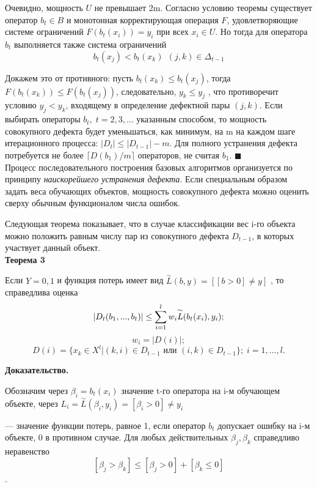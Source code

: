Очевидно, мощность $U$ не превышает 2m. Согласно условию теоремы существует оператор $b_t \in B$ и монотонная корректирующая операция $F$, удовлетворяющие системе
ограничений $F(b_t(x_i)) = y_i$ при всех $x_i \in U$. Но тогда для оператора $b_t$ выполняется
также система ограничений
\[ b_t(x_j) < b_t(x_k) \; \, (j, k) \in \Delta_{t-1}\]


Докажем это от противного: пусть $b_t(x_k) \leq b_t(x_j )$, тогда $F(b_t(x_k)) \leq F(b_t(x_j ))$, следовательно, $y_k \leq y_j$
, что противоречит условию $y_j < y_k$, входящему в определение
дефектной пары $(j, k)$.
Если выбирать операторы $b_t , \; t = 2, 3, . . .$ указанным способом, то мощность
совокупного дефекта будет уменьшаться, как минимум, на m на каждом шаге итерационного процесса: $\vert D_t \vert \leq \vert D_{t-1}\vert -m$. Для полного устранения дефекта потребуется не более $\lceil D(b_1)/m\rceil$
операторов, не считая $b_1$. $\blacksquare$
\\

Процесс последовательного построения базовых алгоритмов организуется
по принципу \textit{наискорейшего устранения дефекта}.
Если специальным образом задать веса
обучающих объектов, мощность совокупного дефекта можно оценить сверху
обычным функционалом числа ошибок.

Следующая теорема показывает, что в случае классификации вес i-го объекта
можно положить равным числу пар из совокупного дефекта $D_{t-1}$, в которых участвует данный объект.\\

\textbf{Теорема 3}

Если $Y = {0, 1}$ и функция потерь имеет вид $\overset{\sim}{L}(b, y) =[[b > 0]\neq y]$ , то справедлива оценка \[\vert D_t(b_1, . . . , b_t)\vert \leq \operatornamewithlimits{\sum}^l_{i=1} w_i \overset{\sim}{L} (b_t(x_i), y_i); \]
\[w_i = \vert D(i)\vert ;\]
\[D(i) = \lbrace x_k \in X^l \vert (k, i) \in D_{t-1} \text{ или } (i, k) \in D_{t-1} \rbrace; \; i = 1, . . . , l.\]

\textbf{Доказательство.}

Обозначим через $\beta_i = b_t(x_i)$ значение t-го оператора на i-м обучающем объекте, через $L_i = \overset{\sim}{L}(\beta_i, y_i) = [\beta_i > 0] \neq y_i$

— значение функции потерь, равное 1, если
оператор $b_t$ допускает ошибку на i-м объекте, 0 в противном случае.
Для любых действительных $\beta_j, \beta_k$ справедливо неравенство
\[[\beta_j > \beta_k] \leq [\beta_j > 0] + [\beta_k \leq 0]\].



